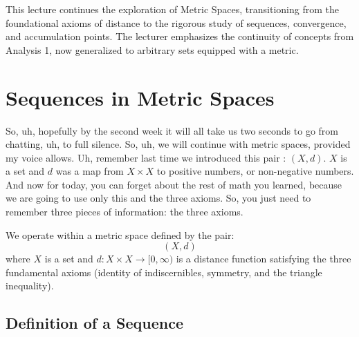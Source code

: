 


\begin{nice-box}[Context]
This lecture continues the exploration of Metric Spaces, transitioning from the foundational axioms of distance to the rigorous study of sequences, convergence, and accumulation points. The lecturer emphasizes the continuity of concepts from Analysis 1, now generalized to arbitrary sets equipped with a metric.
\end{nice-box}

\section{Sequences in Metric Spaces}

\begin{spoken-clean}[00:00:00 - 00:00:50]
So, uh, hopefully by the second week it will all take us two seconds to go from chatting, uh, to full silence. So, uh, we will continue with metric spaces, provided my voice allows. Uh, remember last time we introduced this pair : $(X, d)$. $X$ is a set and $d$ was a map from $X \times X$ to positive numbers, or non-negative numbers. And now for today, you can forget about the rest of math you learned, because we are going to use only this and the three axioms. So, you just need to remember three pieces of information: the three axioms.
\end{spoken-clean}

\begin{math-stroke}
We operate within a metric space defined by the pair:
\[ (X, d) \]
where $X$ is a set and $d: X \times X \to [0, \infty)$ is a distance function satisfying the three fundamental axioms (identity of indiscernibles, symmetry, and the triangle inequality).
\end{math-stroke}

\subsection{Definition of a Sequence}

